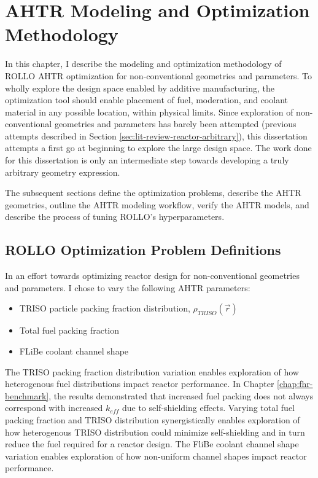 \chapter{AHTR Modeling and Optimization Methodology}
\label{chap:method}
In this chapter, I describe the modeling and optimization methodology of
\acrfull{ROLLO} \acrfull{AHTR} optimization for non-conventional geometries and 
parameters.
To wholly explore the design space enabled by additive manufacturing, the 
optimization tool should enable placement of fuel, moderation, and coolant material 
in any possible location, within physical limits. 
Since exploration of non-conventional geometries and parameters has barely been
attempted (previous attempts described in Section \ref{sec:lit-review-reactor-arbitrary}), 
this dissertation attempts a first go at beginning to explore the large design space.  
The work done for this dissertation is only an intermediate step towards developing 
a truly arbitrary geometry expression. 

The subsequent sections define the optimization problems, describe the \gls{AHTR} geometries, 
outline the \gls{AHTR} modeling workflow, verify the \gls{AHTR} models, and describe the process of
tuning \gls{ROLLO}'s hyperparameters.

\section{ROLLO Optimization Problem Definitions}
\label{sec:opt-problem}
In an effort towards optimizing reactor design for non-conventional geometries 
and parameters.
I chose to vary the following \gls{AHTR} parameters: 
\begin{itemize}
    \item \gls{TRISO} particle packing fraction distribution, 
    $\rho_{TRISO}(\vec{r})$
    \item Total fuel packing fraction
    \item \gls{FLiBe} coolant channel shape 
\end{itemize} 
The TRISO packing fraction distribution variation enables exploration of how 
heterogenous fuel distributions impact reactor performance.
In Chapter \ref{chap:fhr-benchmark}, the results demonstrated that increased fuel 
packing does not always correspond with increased $k_{eff}$ due to self-shielding
effects. 
Varying total fuel packing fraction and TRISO distribution synergistically enables exploration of
how heterogenous TRISO distribution could minimize self-shielding and in turn reduce the fuel 
required for a reactor design. 
The FliBe coolant channel shape variation enables exploration of how non-uniform 
channel shapes impact reactor performance. 

